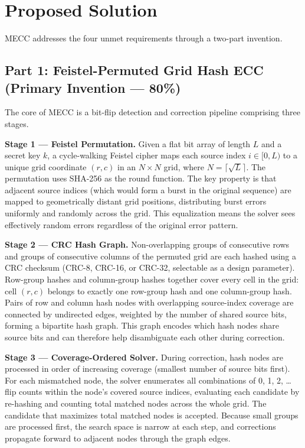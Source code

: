 \section*{Proposed Solution} \label{sec:solution}
\noindent
MECC addresses the four unmet requirements through a two-part invention.

\subsection*{Part 1: Feistel-Permuted Grid Hash ECC (Primary Invention --- 80\%)}

The core of MECC is a bit-flip detection and correction pipeline comprising three stages.

\textbf{Stage 1 --- Feistel Permutation.}
Given a flat bit array of length $L$ and a secret key $k$, a cycle-walking Feistel cipher maps each source index $i \in [0, L)$ to a unique grid coordinate $(r, c)$ in an $N \times N$ grid, where $N = \lceil\sqrt{L}\rceil$.
The permutation uses SHA-256 as the round function.
The key property is that adjacent source indices (which would form a burst in the original sequence) are mapped to geometrically distant grid positions, distributing burst errors uniformly and randomly across the grid.
This equalization means the solver sees effectively random errors regardless of the original error pattern.

\textbf{Stage 2 --- CRC Hash Graph.}
Non-overlapping groups of consecutive rows and groups of consecutive columns of the permuted grid are each hashed using a CRC checksum (CRC-8, CRC-16, or CRC-32, selectable as a design parameter).
Row-group hashes and column-group hashes together cover every cell in the grid: cell $(r, c)$ belongs to exactly one row-group hash and one column-group hash.
Pairs of row and column hash nodes with overlapping source-index coverage are connected by undirected edges, weighted by the number of shared source bits, forming a bipartite hash graph.
This graph encodes which hash nodes share source bits and can therefore help disambiguate each other during correction.

\textbf{Stage 3 --- Coverage-Ordered Solver.}
During correction, hash nodes are processed in order of increasing coverage (smallest number of source bits first).
For each mismatched node, the solver enumerates all combinations of 0, 1, 2, \ldots flip counts within the node's covered source indices, evaluating each candidate by re-hashing and counting total matched nodes across the whole grid.
The candidate that maximizes total matched nodes is accepted.
Because small groups are processed first, the search space is narrow at each step, and corrections propagate forward to adjacent nodes through the graph edges.

